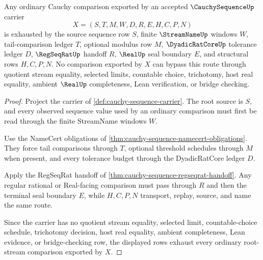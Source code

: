 \begin{theorem}
\label{thm:cauchy-root-stream-comparison-exhaustion}
Any ordinary Cauchy comparison exported by an accepted $\CauchySequenceUp$ carrier
$$
X=(S,T,M,W,D,R,E,H,C,P,N)
$$
is exhausted by the source sequence row $S$, finite $\StreamNameUp$ windows $W$, tail-comparison ledger $T$, optional modulus row $M$, $\DyadicRatCoreUp$ tolerance ledger $D$, $\RegSeqRatUp$ handoff $R$, $\RealUp$ seal boundary $E$, and structural rows $H,C,P,N$. No comparison exported by $X$ can bypass this route through quotient stream equality, selected limits, countable choice, trichotomy, host real equality, ambient $\RealUp$ completeness, Lean verification, or bridge checking.
\end{theorem}
\begin{proof}
Project the carrier of \autoref{def:cauchy-sequence-carrier}. The root source is $S$, and every observed sequence value used by an ordinary comparison must first be read through the finite StreamName windows $W$.

Use the NameCert obligations of \autoref{thm:cauchy-sequence-namecert-obligations}. They force tail comparisons through $T$, optional threshold schedules through $M$ when present, and every tolerance budget through the DyadicRatCore ledger $D$.

Apply the RegSeqRat handoff of \autoref{thm:cauchy-sequence-regseqrat-handoff}. Any regular rational or Real-facing comparison must pass through $R$ and then the terminal seal boundary $E$, while $H,C,P,N$ transport, replay, source, and name the same route.

Since the carrier has no quotient stream equality, selected limit, countable-choice schedule, trichotomy decision, host real equality, ambient completeness, Lean evidence, or bridge-checking row, the displayed rows exhaust every ordinary root-stream comparison exported by $X$.
\end{proof}



